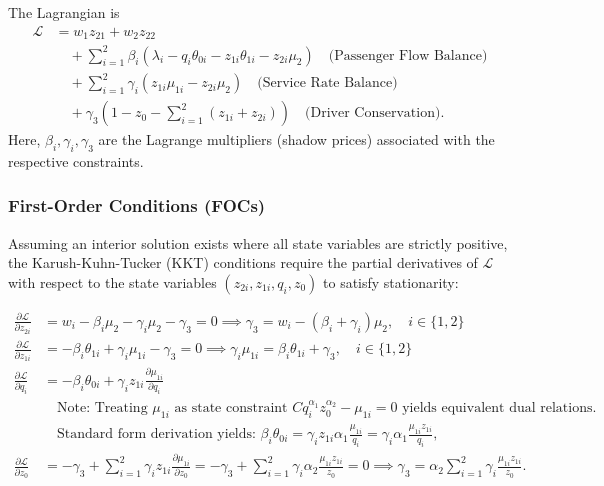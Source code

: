 The Lagrangian is
\begin{align}
\mathcal{L} &= w_1 z_{21} + w_2 z_{22} \nonumber \\
&\quad + \sum_{i=1}^{2} \beta_i (\lambda_i - q_i \theta_{0i} - z_{1i} \theta_{1i} - z_{2i} \mu_2) \quad \text{(Passenger Flow Balance)} \nonumber \\
&\quad + \sum_{i=1}^{2} \gamma_i \left( z_{1i}\mu_{1i} - z_{2i}\mu_2 \right) \quad \text{(Service Rate Balance)} \nonumber \\
&\quad + \gamma_3 \left(1 - z_0 - \sum_{i=1}^2 (z_{1i} + z_{2i}) \right) \quad \text{(Driver Conservation)}. \label{eq:Lagrangian}
\end{align}
Here, $\beta_i, \gamma_i, \gamma_3$ are the Lagrange multipliers (shadow prices) associated with the respective constraints.

\subsubsection{First-Order Conditions (FOCs)}
Assuming an interior solution exists where all state variables are strictly positive, the Karush-Kuhn-Tucker (KKT) conditions require the partial derivatives of $\mathcal{L}$ with respect to the state variables $(z_{2i}, z_{1i}, q_i, z_0)$ to satisfy stationarity:

\begin{align}
\frac{\partial \mathcal{L}}{\partial z_{2i}} &= w_i - \beta_i \mu_2 - \gamma_i \mu_2 - \gamma_3 = 0 \implies \gamma_3 = w_i - (\beta_i + \gamma_i)\mu_2, \quad i \in \{1,2\} \label{eq:foc_z2} \\
\frac{\partial \mathcal{L}}{\partial z_{1i}} &= -\beta_i \theta_{1i} + \gamma_i\mu_{1i} - \gamma_3 = 0 \implies \gamma_i\mu_{1i} = \beta_i \theta_{1i} + \gamma_3, \quad i \in \{1,2\} \label{eq:foc_z1} \\
\frac{\partial \mathcal{L}}{\partial q_i} &= -\beta_i \theta_{0i} + \gamma_i z_{1i} \frac{\partial \mu_{1i}}{\partial q_i} \quad  \nonumber \\
&\quad \text{Note: Treating } \mu_{1i} \text{ as state constraint } C q_i^{\alpha_1} z_0^{\alpha_2} - \mu_{1i} = 0 \text{ yields equivalent dual relations.} \nonumber \\
&\quad \text{Standard form derivation yields: } \beta_i \theta_{0i} = \gamma_i z_{1i}\alpha_1 \frac{\mu_{1i} }{q_i} = \gamma_i \alpha_1 \frac{\mu_{1i} z_{1i}}{q_i}, \label{eq:foc_q} \\
\frac{\partial \mathcal{L}}{\partial z_0} &= -\gamma_3 + \sum_{i=1}^2 \gamma_i z_{1i} \frac{\partial \mu_{1i}}{\partial z_0}= -\gamma_3 +  \sum_{i=1}^2 \gamma_i \alpha_2 \frac{\mu_{1i} z_{1i}}{z_0} = 0 \implies \gamma_3 = \alpha_2 \sum_{i=1}^2 \gamma_i \frac{\mu_{1i} z_{1i}}{z_0}. \label{eq:foc_z0}
\end{align}

